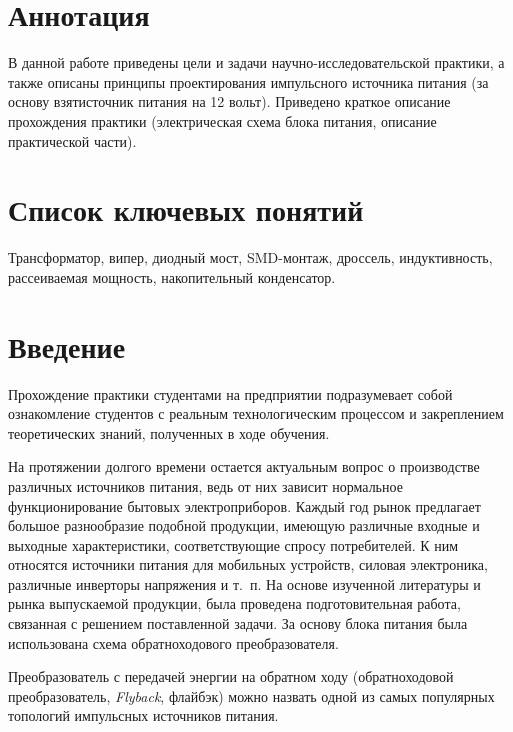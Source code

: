 




\setcounter{page}{3}

\section*{Аннотация}

В данной работе приведены цели и задачи научно-исследовательской практики, а также описаны принципы проектирования импульсного источника питания (за основу взятисточник питания на 12 вольт). Приведено краткое описание прохождения практики
(электрическая схема блока питания, описание практической части).

\section*{Список ключевых понятий}

Трансформатор, випер, диодный мост, SMD-монтаж, дроссель, индуктивность,
рассеиваемая мощность, накопительный конденсатор.

\newpage

\tableofcontents
\newpage

\section{Введение}
Прохождение практики студентами на предприятии подразумевает собой ознакомление
студентов с реальным технологическим процессом и закреплением теоретических
знаний, полученных в ходе обучения.
	
На протяжении долгого времени остается актуальным вопрос о производстве
различных источников питания, ведь от них зависит нормальное функционирование
бытовых электроприборов. Каждый год рынок предлагает большое разнообразие
подобной продукции, имеющую различные входные и выходные характеристики,
соответствующие спросу потребителей. К ним относятся источники питания для
мобильных устройств, силовая электроника, различные инверторы напряжения и т.~п.	
На основе изученной литературы и рынка выпускаемой продукции, была проведена
подготовительная работа, связанная с решением поставленной задачи. За основу
блока питания была использована схема обратноходового преобразователя.
	
Преобразователь с передачей энергии на обратном ходу (обратноходовой
преобразователь, \emph{Flyback}, флайбэк) можно назвать одной из самых
популярных топологий импульсных источников питания.

